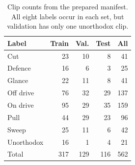 \begin{table}[t]
\centering\small
\begin{tabular}{lrrrr}
\toprule
Label & Train & Val. & Test & All \\
\midrule
Cut & 23 & 10 & 8 & 41 \\
Defence & 16 & 6 & 3 & 25 \\
Glance & 22 & 11 & 8 & 41 \\
Off drive & 76 & 32 & 29 & 137 \\
On drive & 95 & 29 & 35 & 159 \\
Pull & 44 & 29 & 23 & 96 \\
Sweep & 25 & 11 & 6 & 42 \\
Unorthodox & 16 & 1 & 4 & 21 \\
Total & 317 & 129 & 116 & 562 \\
\bottomrule
\end{tabular}
\caption{Clip counts from the prepared manifest. All eight labels occur in each set, but validation has only one unorthodox clip.}
\label{tab:data}
\end{table}
